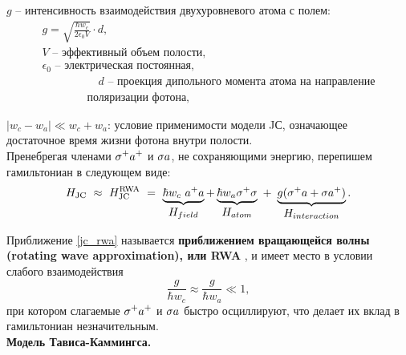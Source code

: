 \hspace{25pt}$g$ -- интенсивность взаимодействия двухуровневого атома с полем:
\begin{gather*}
	g = \sqrt{\frac{\hbar w_{c}}{2 \epsilon_{0} V}} \cdot d,\\
	V\text{ -- эффективный объем полости},\\
	\epsilon_{0}\text{ -- электрическая постоянная},\\
	\hspace{5em}d\text{ -- проекция дипольного момента атома на направление}\\
	\hspace{4em}\text{поляризации фотона},
\end{gather*}

\vspace{-0.5em}
\hspace{25pt}$|w_{c}-w_{a}|\ll w_{c}+w_{a}$: условие применимости модели JС, означающее\\
\indent\hspace{11em}достаточное время жизни фотона внутри полости.
\\[18pt]
\noindent Пренебрегая членами $\displaystyle{\sigma^{+}a^{+}}$ и $\displaystyle{\sigma a}$, не сохраняющими энергию, перепишем гамильтониан в следующем виде:
\begin{equation}\label{jc_rwa}
	H_{\text{JC}}~\approx~H_{\text{JC}}^{\text{RWA}}~=~\underbrace{\hbar w_{c}\ a^{+}a}_{\textstyle H_{field}} + \underbrace{\hbar w_{a}\sigma^{+}\sigma}_{\textstyle H_{atom}}~+~\underbrace{g(\sigma^{+}a+\sigma a^{+})}_{\textstyle H_{interaction}}.
\end{equation}

\noindent Приближение \eqref{jc_rwa} называется \textbf{приближением вращающейся волны (rotating wave approximation), или RWA} \cite{rwa_rabi_1,rwa_rabi_2,ozhigov_qq}, и имеет место в условии слабого взаимодействия
\begin{equation}
	\frac{g}{\hbar w_{c}}\approx\frac{g}{\hbar w_{a}}\ll1,
\end{equation}
при котором слагаемые $\displaystyle{\sigma^{+}a^{+}}$ и $\displaystyle{\sigma a}$ быстро осциллируют, что делает их вклад в гамильтониан незначительным.
\\[28pt]
\indent\textbf{Модель Тависа-Каммингса.}

